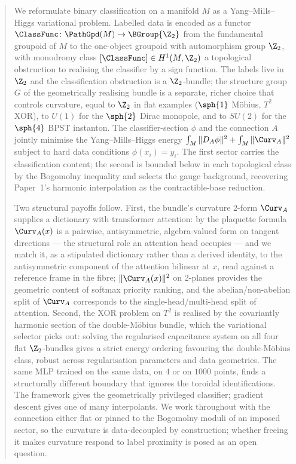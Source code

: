 \begin{abstract}
We reformulate binary classification on a manifold $M$ as a
Yang--Mills--Higgs variational problem. Labelled data is encoded as a
functor $\ClassFunc\colon\PathGpd(M)\to\BGroup{\Z_2}$ from the
fundamental groupoid of $M$ to the one-object groupoid with
automorphism group $\Z_2$, with monodromy class
$[\ClassFunc]\in H^1(M,\Z_2)$ a topological obstruction to
realising the classifier by a sign function. The labels live in
$\Z_2$ and the classification obstruction is a $\Z_2$-bundle; the
structure group $G$ of the geometrically realising bundle is a
separate, richer choice that controls curvature, equal to $\Z_2$
in flat examples ($\sph{1}$ M\"obius, $T^2$ XOR), to $U(1)$ for
the $\sph{2}$ Dirac monopole, and to $SU(2)$ for the $\sph{4}$
BPST instanton. The classifier-section $\phi$ and the
connection $A$ jointly minimise the Yang--Mills--Higgs energy
$\int_M\|D_A\phi\|^2 + \int_M\|\Curv_A\|^2$ subject to hard
data conditions $\phi(x_i)=y_i$. The first sector carries the
classification content; the second is bounded below in each
topological class by the Bogomolny inequality and selects the
gauge background, recovering Paper~1's harmonic interpolation as
the contractible-base reduction.

Two structural payoffs follow. First, the bundle's curvature 2-form
$\Curv_A$ supplies a dictionary with transformer attention: by the
plaquette formula $\Curv_A(x)$ is a pairwise, antisymmetric,
algebra-valued form on tangent directions --- the structural role an
attention head occupies --- and we match it, as a stipulated
dictionary rather than a derived identity, to the antisymmetric
component of the attention bilinear at $x$, read against a reference
frame in the fibre; $\|\Curv_A(x)\|^2$ on 2-planes provides the
geometric content of softmax priority ranking, and the
abelian/non-abelian split of $\Curv_A$ corresponds to the
single-head/multi-head split of attention.
Second, the XOR problem on $T^2$ is realised by the covariantly
harmonic section of the double-M\"obius bundle, which the
variational selector picks out: solving the regularised capacitance
system on all four flat $\Z_2$-bundles gives a strict energy
ordering favouring the double-M\"obius class, robust across
regularisation parameters and data geometries. The same MLP trained
on the same data, on $4$ or on $1000$ points,
finds a structurally different boundary that ignores the toroidal
identifications. The framework gives the geometrically privileged
classifier; gradient descent gives one of many interpolants. We
work throughout with the connection either flat or pinned to the
Bogomolny moduli of an imposed sector, so the curvature is
data-decoupled by construction; whether freeing it makes curvature
respond to label proximity is posed as an open question.
\end{abstract}

